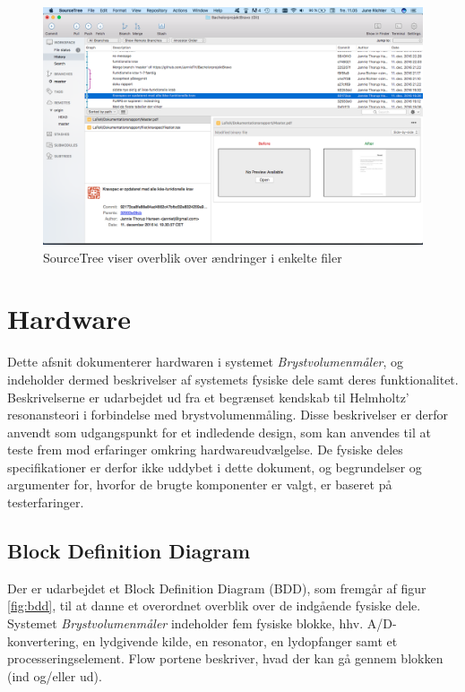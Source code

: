 \begin{figure}[htb]
\centering
\includegraphics[width=5in]{github.png}
\caption{SourceTree viser overblik over ændringer i enkelte filer}
\label{fig:git}	
\end{figure}


\section{Hardware}
Dette afsnit dokumenterer hardwaren i systemet \textit{Brystvolumenmåler}, og indeholder dermed beskrivelser af systemets fysiske dele samt deres funktionalitet. Beskrivelserne er udarbejdet ud fra et begrænset kendskab til Helmholtz' resonansteori i forbindelse med brystvolumenmåling. Disse beskrivelser er derfor anvendt som udgangspunkt for et indledende design, som kan anvendes til at teste frem mod erfaringer omkring hardwareudvælgelse. De fysiske deles specifikationer er derfor ikke uddybet i dette dokument, og begrundelser og argumenter for, hvorfor de brugte komponenter er valgt, er baseret på testerfaringer. 

\subsection{Block Definition Diagram}
Der er udarbejdet et Block Definition Diagram (BDD), som fremgår af figur \ref{fig:bdd}, til at danne et overordnet overblik over de indgående fysiske dele. Systemet \textit{Brystvolumenmåler} indeholder fem fysiske blokke, hhv. A/D-konvertering, en lydgivende kilde, en resonator, en lydopfanger samt et processeringselement. Flow portene beskriver, hvad der kan gå gennem blokken (ind og/eller ud).  
 
